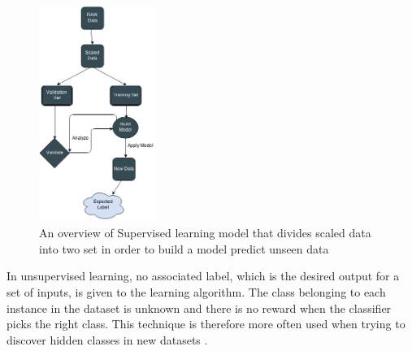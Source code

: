 \begin{figure}[H]
\centering
    \includegraphics[width=38mm,scale=0.3]{./img/SL.png}
    \caption{\footnotesize{An overview of Supervised learning model that divides scaled data into two set in order to build a model predict unseen data }}
    \label{fig:SL}
\end{figure}

In unsupervised learning, no associated label, which is the desired output for a set of inputs, is given to the learning algorithm. The class belonging to each instance in the dataset is unknown and there is no reward when the classifier picks the right class. This technique is therefore more often used when trying to discover hidden classes in new datasets \cite{maglogiannis2007emerging}.






